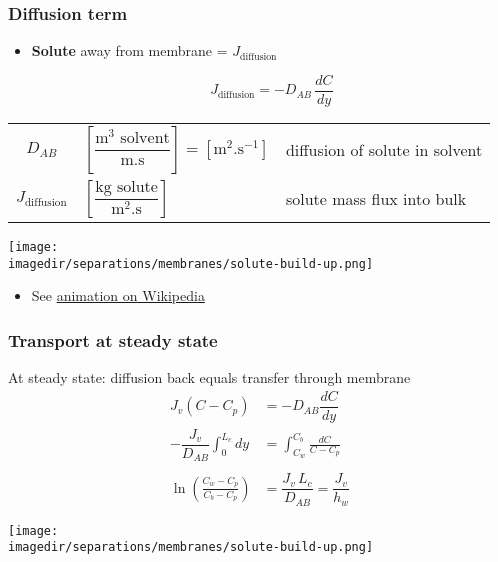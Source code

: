 \begin{frame}\frametitle{Diffusion term}
	\begin{itemize}
		\item	\textbf{Solute} {\color{purple}{diffusion}} away from membrane = $J_\text{diffusion}$
		\begin{exampleblock}{}
			\[
				J_\text{diffusion} = -D_{AB} \,\frac{dC}{dy}
			\]
		\end{exampleblock}
	\end{itemize}

	\begin{tabular}{cll}
		$D_{AB}$				&	$\left[\dfrac{\text{m}^3 \text{~solvent}}{\text{m.s}}\right] = \left[\text{m}^2\text{.s}^{-1}\right]$	& diffusion of solute in solvent \\
		$J_\text{diffusion}$ 	&  	$\left[\dfrac{\text{kg solute}}{\text{m}^2 \text{.s}}\right]$	& solute mass flux into bulk\\
	\end{tabular}
	\begin{center}
		\texttt{[image: \\imagedir/separations/membranes/solute-build-up.png]}
	\end{center}
	\vspace{-6pt}
	\begin{itemize}
		\item	See \href{http://en.wikipedia.org/wiki/File:DiffusionMicroMacro.gif}{animation on Wikipedia}
	\end{itemize}
\end{frame}

\begin{frame}\frametitle{Transport at steady state}
	At steady state: diffusion back equals transfer through membrane
	\[
		\begin{array}{rl}
		 	J_v(C - C_p)  &= -D_{AB} \dfrac{dC}{dy} \\
			-\dfrac{J_v}{D_{AB}} \displaystyle \int_{0}^{L_c}{dy} &= \displaystyle \int_{C_w}^{C_b}{\frac{dC}{C-C_p}} \\ \\
			\displaystyle\ln\left(\frac{C_w - C_p}{C_b - C_p}\right) &= \dfrac{J_v \,L_c}{D_{AB}} = \dfrac{J_v}{h_w}
		\end{array}
	\]
	\vspace{6pt}
	\begin{center}
		\texttt{[image: \\imagedir/separations/membranes/solute-build-up.png]}
	\end{center}
\end{frame}

